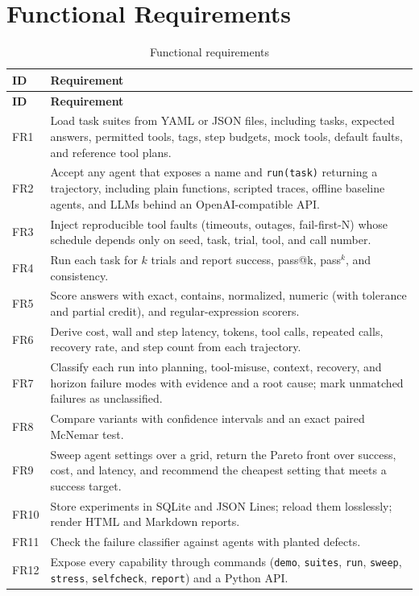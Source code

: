 \documentclass[12pt,a4paper,oneside]{report}
\begin{document}
\section{Functional Requirements}
\begin{longtable}{p{1.3cm}p{12.3cm}}
\caption{Functional requirements}\\
\toprule
\textbf{ID} & \textbf{Requirement} \\
\midrule
\endfirsthead
\toprule
\textbf{ID} & \textbf{Requirement} \\
\midrule
\endhead
FR1 & Load task suites from YAML or JSON files, including tasks, expected answers, permitted tools, tags, step budgets, mock tools, default faults, and reference tool plans. \\
FR2 & Accept any agent that exposes a name and \texttt{run(task)} returning a trajectory, including plain functions, scripted traces, offline baseline agents, and LLMs behind an OpenAI-compatible API. \\
FR3 & Inject reproducible tool faults (timeouts, outages, fail-first-N) whose schedule depends only on seed, task, trial, tool, and call number. \\
FR4 & Run each task for $k$ trials and report success, pass@k, pass$^k$, and consistency. \\
FR5 & Score answers with exact, contains, normalized, numeric (with tolerance and partial credit), and regular-expression scorers. \\
FR6 & Derive cost, wall and step latency, tokens, tool calls, repeated calls, recovery rate, and step count from each trajectory. \\
FR7 & Classify each run into planning, tool-misuse, context, recovery, and horizon failure modes with evidence and a root cause; mark unmatched failures as unclassified. \\
FR8 & Compare variants with confidence intervals and an exact paired McNemar test. \\
FR9 & Sweep agent settings over a grid, return the Pareto front over success, cost, and latency, and recommend the cheapest setting that meets a success target. \\
FR10 & Store experiments in SQLite and JSON Lines; reload them losslessly; render HTML and Markdown reports. \\
FR11 & Check the failure classifier against agents with planted defects. \\
FR12 & Expose every capability through commands (\texttt{demo}, \texttt{suites}, \texttt{run}, \texttt{sweep}, \texttt{stress}, \texttt{selfcheck}, \texttt{report}) and a Python API. \\
\bottomrule
\end{longtable}
\end{document}
